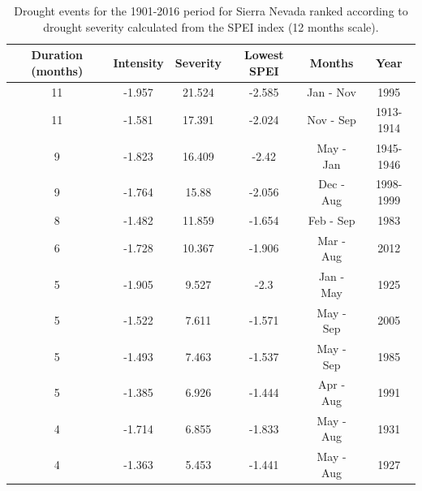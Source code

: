 \begin{table}[ht]
\caption{Drought events for the 1901-2016 period for Sierra Nevada ranked according to drought severity calculated from the SPEI index (12 months scale).}
\label{tab:dendro:droughts}
\centering
\begingroup\fontsize{9}{10}\selectfont
\begin{tabular}{@{}cccccc@{}}
\toprule
\textbf{Duration (months)} & \textbf{Intensity} & \textbf{Severity} & \textbf{Lowest SPEI} & \textbf{Months} & \textbf{Year} \\ \midrule
11 & -1.957 & 21.524 & -2.585 & Jan - Nov & 1995 \\
11 & -1.581 & 17.391 & -2.024 & Nov - Sep & 1913-1914 \\
9 & -1.823 & 16.409 & -2.42 & May - Jan & 1945-1946 \\
9 & -1.764 & 15.88 & -2.056 & Dec - Aug & 1998-1999 \\
8 & -1.482 & 11.859 & -1.654 & Feb - Sep & 1983 \\
6 & -1.728 & 10.367 & -1.906 & Mar - Aug & 2012 \\
5 & -1.905 & 9.527 & -2.3 & Jan - May & 1925 \\
5 & -1.522 & 7.611 & -1.571 & May - Sep & 2005 \\
5 & -1.493 & 7.463 & -1.537 & May - Sep & 1985 \\
5 & -1.385 & 6.926 & -1.444 & Apr - Aug & 1991 \\
4 & -1.714 & 6.855 & -1.833 & May - Aug & 1931 \\
4 & -1.363 & 5.453 & -1.441 & May - Aug & 1927 \\ \bottomrule
\end{tabular}
\endgroup{}
\end{table}


